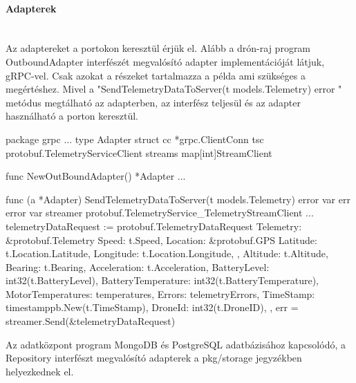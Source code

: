 \paragraph{Adapterek} \mbox{} \\
Az adaptereket a portokon keresztül érjük el.
Alább a drón-raj program OutboundAdapter interfészét megvalósító adapter implementációját látjuk, gRPC-vel.
Csak azokat a részeket tartalmazza a példa ami szükséges a megértéshez.
Mivel a "SendTelemetryDataToServer(t models.Telemetry) error " metódus megtálható az adapterben, az interfész teljesül és az adapter használható a porton keresztül.
\begin{python}
    package grpc
    ...
    type Adapter struct {
        cc  *grpc.ClientConn
        tsc protobuf.TelemetryServiceClient
        streams map[int]StreamClient
    }

    func NewOutBoundAdapter() *Adapter {
        ...
    }

    func (a *Adapter) SendTelemetryDataToServer(t models.Telemetry) error {
        var err error
        var streamer protobuf.TelemetryService_TelemetryStreamClient
        ...
        telemetryDataRequest := protobuf.TelemetryDataRequest{
            Telemetry: &protobuf.Telemetry{
                Speed: t.Speed,
                Location: &protobuf.GPS{
                    Latitude:  t.Location.Latitude,
                    Longitude: t.Location.Longitude,
                },
                Altitude:           t.Altitude,
                Bearing:            t.Bearing,
                Acceleration:       t.Acceleration,
                BatteryLevel:       int32(t.BatteryLevel),
                BatteryTemperature: int32(t.BatteryTemperature),
                MotorTemperatures:  temperatures,
                Errors:             telemetryErrors,
                TimeStamp:          timestamppb.New(t.TimeStamp),
                DroneId:            int32(t.DroneID),
            },
        }
        err = streamer.Send(&telemetryDataRequest)
    }

\end{python}

Az adatközpont program MongoDB és PostgreSQL adatbázisához kapcsolódó, a Repository interfészt megvalósító adapterek a pkg/storage jegyzékben helyezkednek el.


